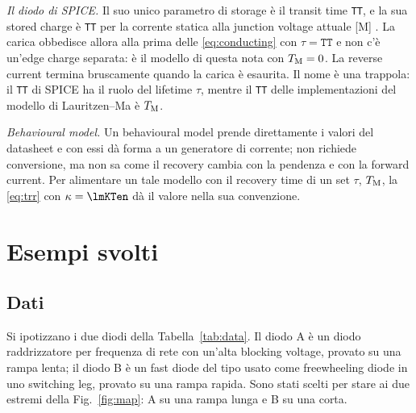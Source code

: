 \documentclass[10pt,a4paper]{scrartcl}
\let\newcommand\lmitdefine
\newcommand{\TM}{T_\mathrm{M}}
\begin{document}
\emph{Il diodo di SPICE.} Il suo unico parametro di storage è il transit time \texttt{TT}, e la sua stored charge è \texttt{TT} per la corrente statica alla junction voltage attuale [M] \cite{nagel1975}. La carica obbedisce allora alla prima delle \eqref{eq:conducting} con $\tau = \texttt{TT}$ e non c'è un'edge charge separata: è il modello di questa nota con $\TM = 0$. La reverse current termina bruscamente quando la carica è esaurita. Il nome è una trappola: il \texttt{TT} di SPICE ha il ruolo del lifetime $\tau$, mentre il \texttt{TT} delle implementazioni del modello di Lauritzen--Ma è $\TM$.

\emph{Behavioural model.} Un behavioural model prende direttamente i valori del datasheet e con essi dà forma a un generatore di corrente; non richiede conversione, ma non sa come il recovery cambia con la pendenza e con la forward current. Per alimentare un tale modello con il recovery time di un set $\tau$, $\TM$, la \eqref{eq:trr} con $\kappa = \lmKTen$ dà il valore nella sua convenzione.

\section{Esempi svolti}
\label{sec:examples}
\subsection{Dati}
Si ipotizzano i due diodi della Tabella~\ref{tab:data}. Il diodo A è un diodo raddrizzatore per frequenza di rete con un'alta blocking voltage, provato su una rampa lenta; il diodo B è un fast diode del tipo usato come freewheeling diode in uno switching leg, provato su una rampa rapida. Sono stati scelti per stare ai due estremi della Fig.~\ref{fig:map}: A su una rampa lunga e B su una corta.
\end{document}
